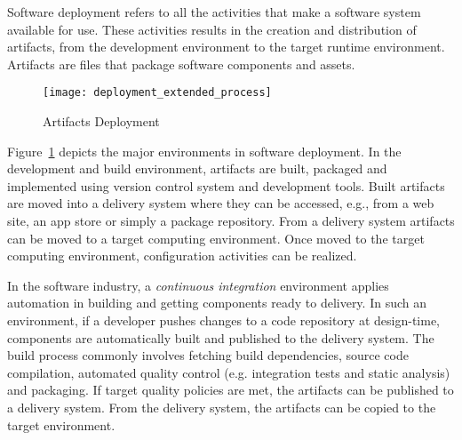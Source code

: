 Software deployment refers to all the activities that make a software system available for use\cite{carzaniga_characterization_1998}. These activities results
in the creation and distribution of artifacts,  from the development environment to the target runtime environment. Artifacts are files that package software components and assets.



\begin{figure}[!htb]
  \centering
  \texttt{[image: deployment\_extended\_process]}
  \caption{Artifacts Deployment}
  \label{fig:deployment_extended_process}
\end{figure}

Figure~\ref{fig:deployment_extended_process} depicts the major environments in software deployment.  In the development and build environment, artifacts are built, packaged and implemented using version control system and development tools. Built artifacts are moved into a delivery system where they can be accessed, e.g., from a web site, an app store or simply a package repository. From a delivery system artifacts can be moved to a target computing environment. Once moved to the target computing environment, configuration activities can be realized.

In the software industry, a \emph{continuous integration} environment applies automation in building and getting components ready to delivery. In such an environment, if a developer pushes changes to a code repository at design-time, components are automatically built and published to the delivery system. The build process commonly involves fetching build dependencies, source code compilation, automated quality control (e.g. integration tests and static analysis) and packaging. If target quality policies are met, the artifacts can be published to a delivery system. From the delivery system, the artifacts can be copied to the target environment.

